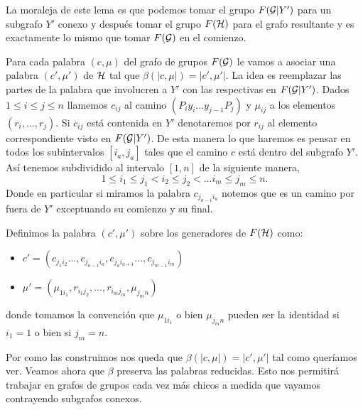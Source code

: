 \documentclass[tesis.tex]{subfiles}
\begin{document}
La moraleja de este lema es que podemos tomar el grupo $F({\cal G} | Y')$ para un subgrafo $Y'$ conexo y después tomar el grupo $F({\cal H})$ para el grafo resultante y es exactamente lo mismo que tomar $F({\cal G})$ en el comienzo.

Para cada palabra $(c, \mu)$ del grafo de grupos $F({\cal G})$ le vamos a asociar una palabra $(c', \mu')$ de ${\cal H}$ tal que $\beta (|c,\mu|) = |c',\mu'|$.
La idea es reemplazar las partes de la palabra que involucren a $Y'$ con las respectivas en $F({\cal G} | Y')$.
Dados $ 1 \le i \le j \le n$ llamemos $c_{ij}$ al camino $(P_iy_i \dots y_{j-1}P_j)$ y $\mu_{ij}$ a los elementos $(r_i, \dots, r_j)$.
Si $c_{ij}$ está contenida en $Y'$ denotaremos por $r_{ij}$ al elemento correspondiente visto en $F({\cal G} | Y')$.
De esta manera lo que haremos es pensar en todos los subintervalos $[i_a,j_a]$ tales que el camino $c$ está dentro del subgrafo $Y'$.
Así tenemos subdividido al intervalo $[1,n]$ de la siguiente manera,
\[
	1\le i_1 \le j_1 < i_2 \le j_2 < \dots i_m \le j_m \le n.
\]
Donde en particular si miramos la palabra $c_{j_{a-1}i_a}$ notemos que es un camino por fuera de $Y'$ exceptuando su comienzo y su final.

Definimos la palabra $(c', \mu')$ sobre los generadores de $F({\cal H})$ como:
\begin{itemize}
	\item $c' = (c_{j_1i_2} \dots, c_{j_{a-1}i_a},c_{j_{a}i_{a+1}} \dots, c_{j_{m-1}i_{m}})$
	\item $\mu' = (\mu_{1i_1}, r_{i_1j_2}, \dots, r_{i_mj_m}, \mu_{j_m n}   )$
\end{itemize}
donde tomamos la convención que $\mu_{1i_1}$ o bien $\mu_{j_m n}$ pueden ser la identidad si $i_1=1$ o bien si $j_m = n$.




Por como las construimos nos queda que $\beta(|c,\mu|) = |c',\mu'|$ tal como queríamos ver.
Veamos ahora que $\beta$ preserva las palabras reducidas. 
Esto nos permitirá trabajar en grafos de grupos cada vez más chicos a medida que vayamos contrayendo subgrafos conexos.
\end{document}
